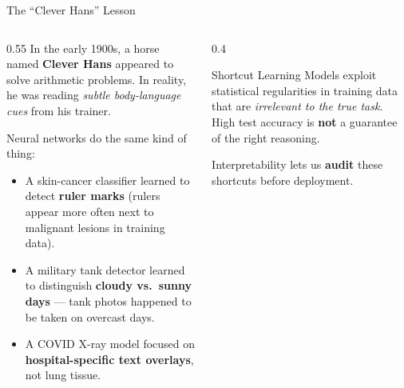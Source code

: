 \documentclass[aspectratio=169]{beamer}
\begin{document}
\begin{frame}{The ``Clever Hans'' Lesson}
  \begin{columns}[T]
    \begin{column}{0.55\textwidth}
      In the early 1900s, a horse named \textbf{Clever Hans} appeared to solve
      arithmetic problems. In reality, he was reading \emph{subtle body-language
      cues} from his trainer.

      \vspace{0.7em}
      Neural networks do the same kind of thing:
      \begin{itemize}
        \item A skin-cancer classifier learned to detect \textbf{ruler marks}
              (rulers appear more often next to malignant lesions in training data).
        \item A military tank detector learned to distinguish \textbf{cloudy vs.\ sunny
              days} — tank photos happened to be taken on overcast days.
        \item A COVID X-ray model focused on \textbf{hospital-specific text overlays},
              not lung tissue.
      \end{itemize}
    \end{column}
    \begin{column}{0.4\textwidth}
      \begin{alertblock}{Shortcut Learning}
        Models exploit statistical regularities in training data that are
        \emph{irrelevant to the true task}.
        High test accuracy is \textbf{not} a guarantee of the right reasoning.
      \end{alertblock}

      \vspace{0.6em}
      Interpretability lets us \textbf{audit} these shortcuts before deployment.
    \end{column}
  \end{columns}
\end{frame}
\end{document}
